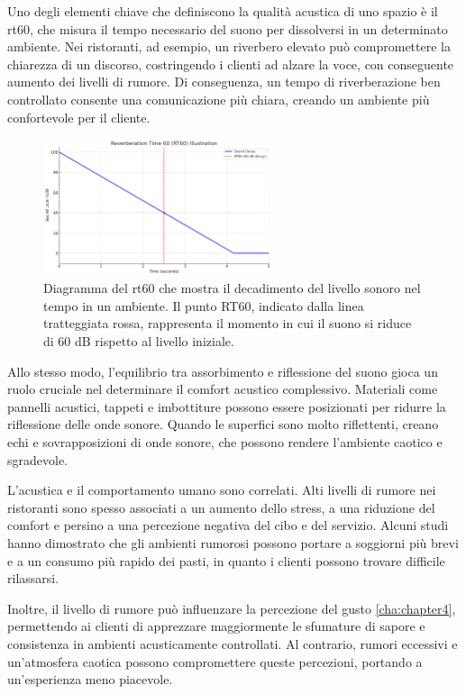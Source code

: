 Uno degli elementi chiave che definiscono la qualità acustica di uno spazio è il \gls{rt60}, che misura il tempo necessario del suono per dissolversi in un determinato ambiente. Nei ristoranti, ad esempio, un riverbero elevato può compromettere la chiarezza di un discorso, costringendo i clienti ad alzare la voce, con conseguente aumento dei livelli di rumore. Di conseguenza, un tempo di riverberazione ben controllato consente una comunicazione più chiara, creando un ambiente più confortevole per il cliente.

\begin{figure}[H]
      \centering
      \includegraphics[width=0.6\textwidth]{Chapters/Figures/RT60.png}
      \caption{\small Diagramma del \gls{rt60} che mostra il decadimento del livello sonoro nel tempo in un ambiente. Il punto RT60, indicato dalla linea tratteggiata rossa, rappresenta il momento in cui il suono si riduce di 60 dB rispetto al livello iniziale.}
      \label{fig:RT60}
\end{figure}

Allo stesso modo, l'equilibrio tra assorbimento e riflessione del suono gioca un ruolo cruciale nel determinare il comfort acustico complessivo. Materiali come pannelli acustici, tappeti e imbottiture possono essere posizionati per ridurre la riflessione delle onde sonore. Quando le superfici sono molto riflettenti, creano echi e sovrapposizioni di onde sonore, che possono rendere l'ambiente caotico e sgradevole.

L'acustica e il comportamento umano sono correlati. Alti livelli di rumore nei ristoranti sono spesso associati a un aumento dello stress, a una riduzione del comfort e persino a una percezione negativa del cibo e del servizio. Alcuni studi hanno dimostrato che gli ambienti rumorosi possono portare a soggiorni più brevi e a un consumo più rapido dei pasti, in quanto i clienti possono trovare difficile rilassarsi. \cite{gbacoustics2023}

Inoltre, il livello di rumore può influenzare la percezione del gusto \ref{cha:chapter4}, permettendo ai clienti di apprezzare maggiormente le sfumature di sapore e consistenza in ambienti acusticamente controllati. Al contrario, rumori eccessivi e un’atmosfera caotica possono compromettere queste percezioni, portando a un’esperienza meno piacevole.

